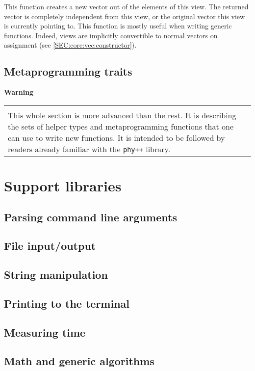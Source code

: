 \documentclass[12pt]{report}
\newcommand{\phypp}{\texttt{phy++}\xspace}
\newenvironment{warning}
{
    \vspace{0.3cm}\noindent \textbf{\color{blue} Warning} \\
    \noindent\begin{tabular}{p{0.95\textwidth}}
    \hline\\[-0.3cm]
}
{
    \\[0.2cm]\hline
    \end{tabular}
}
\begin{document}
This function creates a new vector out of the elements of this view. The returned vector is completely independent from this view, or the original vector this view is currently pointing to. This function is mostly useful when writing generic functions. Indeed, views are implicitly convertible to normal vectors on assignment (see \ref{SEC:core:vec:constructor}).

\section{Metaprogramming traits \label{SEC:core:meta}}

\begin{warning}
This whole section is more advanced than the rest. It is describing the sets of helper types and metaprogramming functions that one can use to write new functions. It is intended to be followed by readers already familiar with the \phypp library.
\end{warning}

\chapter{Support libraries}

\section{Parsing command line arguments}

\section{File input/output}

\section{String manipulation}

\section{Printing to the terminal}

\section{Measuring time}

\section{Math and generic algorithms}
\end{document}

